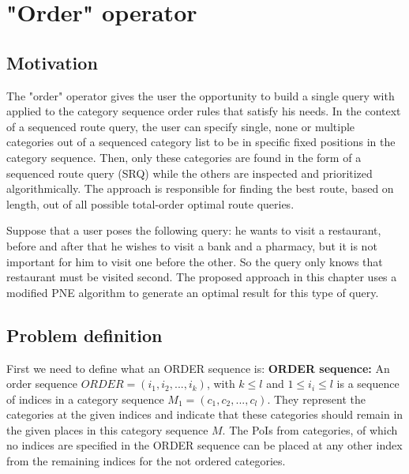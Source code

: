 


\section{"Order" operator}

\subsection{Motivation}
\label{sec:motORDER}
The "order" operator gives the user the opportunity to build a single query with applied to the category sequence order rules that satisfy his needs. In the context of a sequenced route query, the user can specify single, none or multiple categories out of a sequenced category list to be in specific fixed positions in the category sequence. Then, only these categories are found in the form of a sequenced route query (SRQ) while the others are inspected and prioritized algorithmically. The approach is responsible for finding the best route, based on length, out of all possible total-order optimal route queries.

Suppose that a user poses the following query: he wants to visit a restaurant, before and after that he wishes to visit a bank and a pharmacy, but it is not important for him to visit one before the other. So the query only knows that restaurant must be visited second. The proposed approach in this chapter uses a modified PNE algorithm to generate an optimal result for this type of query.

\subsection{Problem definition} 
\label{sec:problemOrder}
First we need to define what an ORDER sequence is:\newline
\textbf{ORDER sequence:} An order sequence $ORDER = (i_1, i_2, ..., i_k)$, with $k \leq l$ and $1 \leq i_i \leq l$ is a sequence of indices in a category sequence $M_1 = (c_1, c_2, ..., c_l)$. They represent the categories at the given indices and indicate that these categories should remain in the given places in this category sequence $M$. The PoIs from categories, of which no indices are specified in the ORDER sequence can be placed at any other index from the remaining indices for the not ordered categories.

